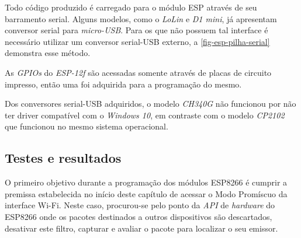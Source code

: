 \begin{table}[htb]
\end{table}

Todo código produzido é carregado para o módulo ESP através de seu barramento
serial. Alguns modelos, como o \emph{LoLin} e \emph{D1 mini}, já apresentam
conversor serial para \emph{micro-USB}. Para os que não possuem tal interface é
necessário utilizar um conversor serial-USB externo, a
\autoref{fig-esp-pilha-serial} demonstra esse método.

As \emph{GPIOs} do \emph{ESP-12f} são acessadas somente através de placas
de circuito impresso, então uma foi adquirida para a programação do mesmo.

Dos conversores serial-USB adquiridos, o modelo \emph{CH340G} não funcionou por
não ter driver compatível com o \emph{Windows 10}, em contraste com o modelo
\emph{CP2102}  que funcionou no mesmo sistema operacional.


\subsection{Testes e resultados}
\label{subsec:mercado-esp}

O primeiro objetivo durante a programação dos módulos ESP8266 é cumprir a
premissa  estabelecida no início deste capítulo de acessar o Modo Promíscuo da
interface Wi-Fi. Neste caso, procurou-se pelo ponto da \emph{API} de
\emph{hardware} do ESP8266 onde os pacotes destinados a outros dispositivos são
descartados, desativar este filtro, capturar e avaliar o pacote para localizar o
seu emissor.

